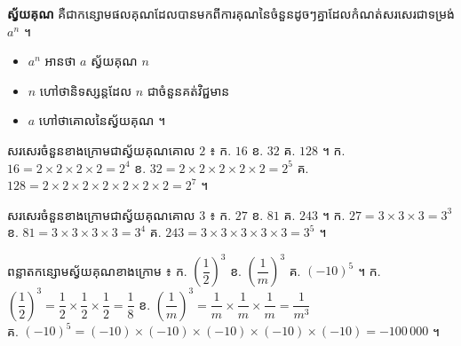 \begin{definition}[និយមន័យ]
\textbf{ស្វ័យគុណ} គឺជាកន្សោមផលគុណដែលបានមកពីការគុណនៃចំនួនដូចៗគ្នាដែលកំណត់សរសេរជាទម្រង់ $a^n$ ។
\begin{itemize}
  \item $a^n$ អានថា $a$ ស្វ័យគុណ $n$
  \item $n$ ហៅថានិទស្សន្តដែល $n$ ជាចំនួនគត់វិជ្ជមាន
  \item $a$ ហៅថាគោលនៃស្វ័យគុណ ។
\end{itemize}
\end{definition}

\begin{example}[លំហាត់គំរូ ១]
សរសេរចំនួនខាងក្រោមជាស្វ័យគុណគោល $2$ ៖ \quad ក. $16$ \quad ខ. $32$ \quad គ. $128$ ។
\ans
ក. $16 = 2\times 2\times 2\times 2 = 2^4$ \quad ខ. $32 = 2\times 2\times 2\times 2\times 2 = 2^5$ \quad គ. $128 = 2\times 2\times 2\times 2\times 2\times 2\times 2 = 2^7$ ។
\end{example}

\begin{example}[លំហាត់គំរូ ២]
សរសេរចំនួនខាងក្រោមជាស្វ័យគុណគោល $3$ ៖ \quad ក. $27$ \quad ខ. $81$ \quad គ. $243$ ។
\ans
ក. $27 = 3\times 3\times 3 = 3^3$ \quad ខ. $81 = 3\times 3\times 3\times 3 = 3^4$ \quad គ. $243 = 3\times 3\times 3\times 3\times 3 = 3^5$ ។
\end{example}

\begin{example}[លំហាត់គំរូ ៣]
ពន្លាតកន្សោមស្វ័យគុណខាងក្រោម ៖ \quad ក. $\left(\dfrac{1}{2}\right)^3$ \quad ខ. $\left(\dfrac{1}{m}\right)^3$ \quad គ. $(-10)^5$ ។
\ans
ក. $\left(\dfrac{1}{2}\right)^3 = \dfrac{1}{2}\times\dfrac{1}{2}\times\dfrac{1}{2} = \dfrac{1}{8}$ \quad ខ. $\left(\dfrac{1}{m}\right)^3 = \dfrac{1}{m}\times\dfrac{1}{m}\times\dfrac{1}{m} = \dfrac{1}{m^3}$\\
គ. $(-10)^5 = (-10)\times(-10)\times(-10)\times(-10)\times(-10) = -100\,000$ ។
\end{example}

